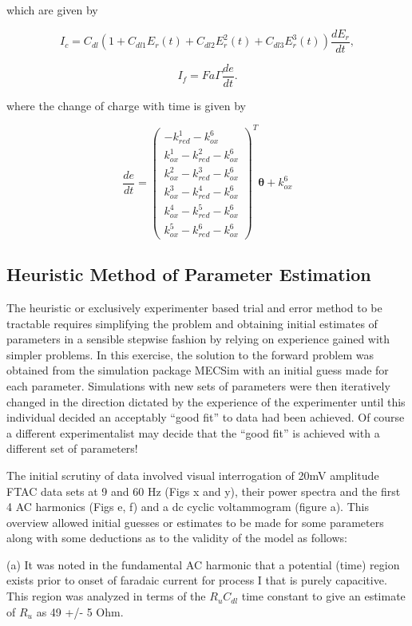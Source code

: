 \documentclass[a4paper, 12pt]{article}
\begin{document}
which are given by

$$
I_c = C_{dl} \left(1 + C_{dl1} E_r(t) + C_{dl2} E_r^2(t) + C_{dl3} 
E_r^3(t)\right) \frac{dE_r}{dt},
$$

$$
I_f = F a \Gamma \frac{de}{dt}.
$$

where the change of charge with time is given by

$$
\frac{de}{dt} = 
\begin{pmatrix}
    -k^1_{red}-k^6_{ox} \\
    k^1_{ox}-k^2_{red}-k^6_{ox} \\
    k^2_{ox}-k^3_{red}-k^6_{ox} \\
    k^3_{ox}-k^4_{red}-k^6_{ox} \\
    k^4_{ox}-k^5_{red}-k^6_{ox} \\
    k^5_{ox}-k^6_{red}-k^6_{ox}
\end{pmatrix}^T \bm{\theta} +  k^6_{ox} 
$$


\subsection{Heuristic Method of Parameter Estimation}

The heuristic or exclusively experimenter based trial and error method to be 
tractable requires simplifying the problem and obtaining initial estimates of 
parameters in a sensible stepwise fashion by relying on experience gained with 
simpler problems. In this exercise, the solution to the forward problem was 
obtained from the simulation package MECSim with an initial guess made for each 
parameter. Simulations with new sets of parameters were then iteratively changed 
in the direction dictated by the experience of the experimenter until this 
individual decided an acceptably “good fit” to data had been achieved. Of course 
a different experimentalist may decide that the “good fit” is achieved with a 
different set of parameters!

The initial scrutiny of data involved visual interrogation of   20mV amplitude 
FTAC data sets at 9 and 60 Hz (Figs x and y), their power spectra and the first 
4 AC harmonics (Figs e, f) and a dc cyclic voltammogram (figure a). This 
overview allowed initial guesses or estimates to be made for some parameters 
along with some deductions as to the validity of the model as follows:

(a) It was noted in the fundamental AC harmonic that a potential (time) region 
exists prior to onset of faradaic current for process I that is purely 
capacitive.  This region was analyzed in terms of the $R_u  C_{dl}$ time constant to 
give an estimate of $R_u$ as 49 +/- 5 Ohm. 
\end{document}
